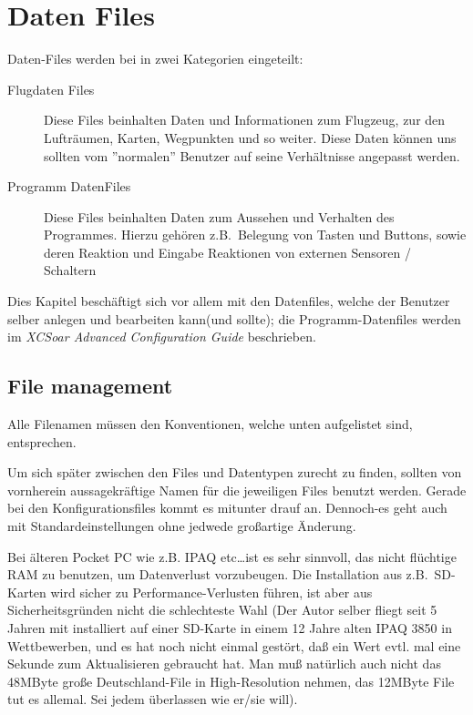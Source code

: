 \chapter{Daten  Files}\label{cha:data-files}
Daten-Files werden bei \xc in zwei Kategorien eingeteilt:
\begin{description}
\item[Flugdaten Files ] Diese Files beinhalten Daten und Informationen zum Flugzeug, zur den
    Lufträumen, Karten, Wegpunkten und so weiter.  Diese Daten können uns sollten vom ''normalen''
    Benutzer auf seine Verhältnisse angepasst werden.
\item[Programm DatenFiles] Diese Files beinhalten Daten zum Aussehen und Verhalten des
    Programmes. Hierzu gehören z.B.\ Belegung von Tasten und Buttons, sowie deren Reaktion und
    Eingabe Reaktionen von externen Sensoren / Schaltern
\end{description}
Dies Kapitel beschäftigt sich vor allem mit den Datenfiles, welche der Benutzer selber anlegen und
bearbeiten kann(und sollte);  die Programm-Datenfiles werden im {\em XCSoar Advanced Configuration
Guide} beschrieben.


\section{File management}
Alle Filenamen müssen den Konventionen, welche unten aufgelistet sind, entsprechen.

Um sich später zwischen den Files und Datentypen zurecht zu finden, sollten von vornherein
aussagekräftige Namen für die jeweiligen Files benutzt werden. Gerade bei den Konfigurationsfiles
kommt es mitunter drauf an. Dennoch-es geht auch mit Standardeinstellungen ohne jedwede großartige
Änderung.

Bei älteren Pocket PC wie z.B. IPAQ etc\dots ist es sehr sinnvoll, das nicht flüchtige RAM zu benutzen, um
Datenverlust vorzubeugen. Die Installation aus z.B.\ SD-Karten wird sicher zu Performance-Verlusten
führen, ist aber aus Sicherheitsgründen nicht die schlechteste Wahl (Der Autor selber fliegt seit 5 Jahren
mit \xc installiert auf einer SD-Karte in einem 12 Jahre alten IPAQ 3850 in Wettbewerben, und es hat noch
nicht einmal gestört, daß ein Wert evtl. mal eine Sekunde zum Aktualisieren gebraucht hat. Man muß
natürlich auch nicht das 48MByte große Deutschland-File in High-Resolution  nehmen, das 12MByte File tut es
allemal. Sei jedem überlassen wie er/sie will).

